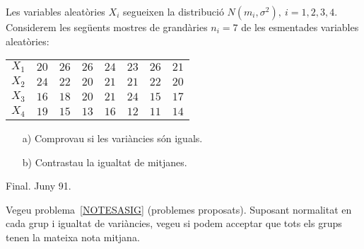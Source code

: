 \begin{prob}
{Les variables aleat\`ories $X_i$ segueixen la distribuci\'o
$N(m_i,\sigma^2),\ i=1,2,3,4$. Considerem les seg\"uents
mostres de grand\`aries $n_i=7$ de les esmentades variables aleat\`ories:
\begin{center}
\begin{tabular}{cccccccc}
$X_1$&$20$&$26$&$26$&$24$&$23$&$26$&$21$\\
$X_2$&$24$&$22$&$20$&$21$&$21$&$22$&$20$\\
$X_3$&$16$&$18$&$20$&$21$&$24$&$15$&$17$\\
$X_4$&$19$&$15$&$13$&$16$&$12$&$11$&$14$\\
\end{tabular}
\end{center}

\begin{itemize}
\item[a)] {Comprovau si les vari\`ancies s\'on iguals.}
\item[b)] {Contrastau la igualtat de mitjanes.}
\end{itemize}
{\footnotesize Final. Juny 91.}
}
\end{prob}

\begin{prob}
{Vegeu problema~\ref{NOTESASIG} (problemes proposats). 
Suposant normalitat en cada grup i igualtat de
vari\`ancies, vegeu si podem acceptar que tots els grups tenen
la mateixa nota mitjana.
}
\end{prob}







